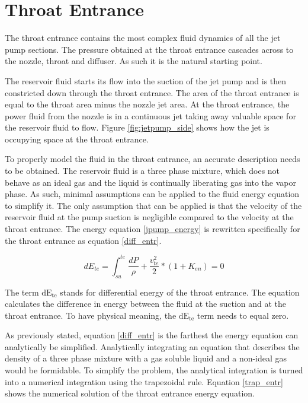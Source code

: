 \documentclass[12 pt]{report}
\newcommand{\dete}{$\mathrm{dE_{te}}$\xspace}  %
\begin{document}


\section{Throat Entrance}

The throat entrance contains the most complex fluid dynamics of all the jet pump sections. The pressure obtained at the throat entrance cascades across to the nozzle, throat and diffuser. As such it is the natural starting point.

The reservoir fluid starts its flow into the suction of the jet pump and is then constricted down through the throat entrance. The area of the throat entrance is equal to the throat area minus the nozzle jet area. At the throat entrance, the power fluid from the nozzle is in a continuous jet taking away valuable space for the reservoir fluid to flow. Figure \ref{fig:jetpump_side} shows how the jet is occupying space at the throat entrance.

To properly model the fluid in the throat entrance, an accurate description needs to be obtained. The reservoir fluid is a three phase mixture, which does not behave as an ideal gas and the liquid is continually liberating gas into the vapor phase. As such, minimal assumptions can be applied to the fluid energy equation to simplify it. The only assumption that can be applied is that the velocity of the reservoir fluid at the pump suction is negligible compared to the velocity at the throat entrance. The energy equation \eqref{jpump_energy} is rewritten specifically for the throat entrance as equation \eqref{diff_entr}.

\begin{equation}
dE_{te} = \int_{su}^{te} \frac{dP}{\rho} + \frac{v_{te}^{2}}{2} * (1+K_{en}) = 0
\label{diff_entr}
\end{equation}

The term \dete stands for differential energy of the throat entrance. The equation calculates the difference in energy between the fluid at the suction and at the throat entrance. To have physical meaning, the \dete term needs to equal zero.

As previously stated, equation \eqref{diff_entr} is the farthest the energy equation can analytically be simplified. Analytically integrating an equation that describes the density of a three phase mixture with a gas soluble liquid and a non-ideal gas would be formidable. To simplify the problem, the analytical integration is turned into a numerical integration using the trapezoidal rule. Equation \eqref{trap_entr} shows the numerical solution of the throat entrance energy equation.
\end{document}
